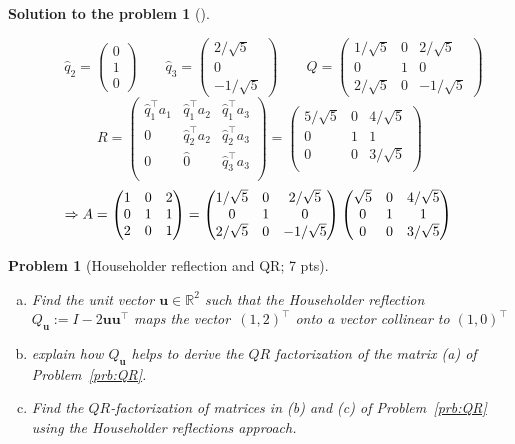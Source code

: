 \documentclass[12pt,a4]{article}
\newtheorem{problem}{Problem}
\newtheorem{solution}{Solution to the problem}
\newcommand{\bR}{{\mathbb R}}
\newcommand{\bu}{{\mathbf u}}
\begin{document}
\begin{solution}[]
\begin{enumerate}[(a)]
\[\qquad
\hat q_2 =
\begin{pmatrix} 0 \\ 1 \\ 0  \end{pmatrix}
\qquad
\hat q_3 =
\begin{pmatrix} 2/\sqrt 5 \\ 0 \\ -1/\sqrt 5  \end{pmatrix}
\qquad
Q = 
\begin{pmatrix}
1/\sqrt 5 & 0 & 2/\sqrt 5\\
0 & 1 & 0 \\
2/\sqrt 5 & 0 & -1/\sqrt 5
\end{pmatrix}
\]
\[
R =
\begin{pmatrix}
\hat q_1^\top a_1 & \hat q_1^\top a_2 & \hat q_1^\top a_3 \\
0 & \hat q_2^\top a_2 & \hat q_2^\top a_3\\
0 & \hat 0 & \hat q_3^\top a_3\\
\end{pmatrix}
=
\begin{pmatrix}
5/\sqrt 5 & 0 & 4/\sqrt 5\\
0 & 1 & 1\\
0 & 0 & 3/\sqrt 5\\
\end{pmatrix}
\]
\[
\Rightarrow A = 
\begin{pmatrix}
1 & 0 & 2 \\
0 & 1 & 1 \\
2 & 0 & 1
\end{pmatrix}
=
\begin{pmatrix}
1/\sqrt 5 & 0 & 2/\sqrt 5\\
0 & 1 & 0 \\
2/\sqrt 5 & 0 & -1/\sqrt 5
\end{pmatrix}
\begin{pmatrix}
\sqrt 5 & 0 & 4/\sqrt 5\\
0 & 1 & 1\\
0 & 0 & 3/\sqrt 5\\
\end{pmatrix}\\
\]
\end{enumerate}
\end{solution}


\begin{problem}[Householder reflection and QR; 7 pts]\rm
	\begin{enumerate}[(a)]
		\item Find the unit vector $\bu\in \bR^2$ such that the \emph{Householder reflection} $Q_{\bu}:=I - 2\bu\bu^\top$ maps the vector~$(1,2)^\top$ onto a vector collinear to $(1,0)^\top$
		\item explain how $Q_{\bu}$ helps to derive the $QR$ factorization of the matrix (a) of Problem~\ref{prb:QR}.
		\item Find the $QR$-factorization of matrices in (b) and (c) of Problem~\ref{prb:QR} using the Householder reflections approach.
	\end{enumerate}
\end{problem}
\end{document}
